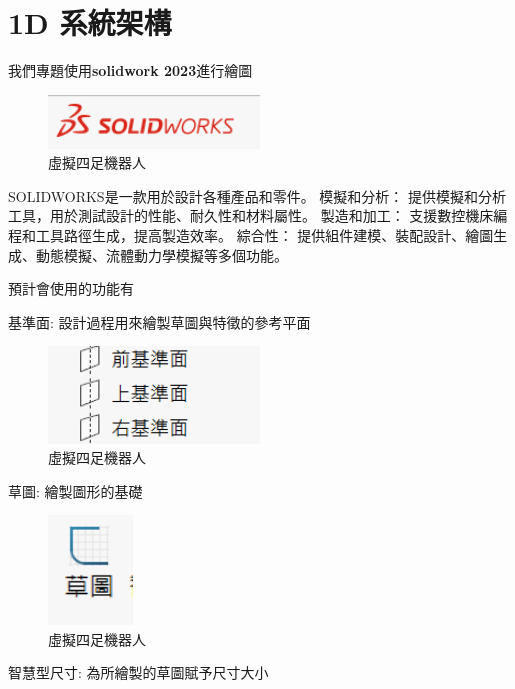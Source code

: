 
\section{1D 系統架構}
我們專題使用\textbf{solidwork 2023}進行繪圖

\begin{figure}[h!]
    \centering
    \includegraphics[width=0.5\textwidth]{./../images/6-1-1.png}
    \caption{\Large 虛擬四足機器人}
\end{figure}

\noindent SOLIDWORKS是一款用於設計各種產品和零件。 模擬和分析： 提供模擬和分析工具，用於測試設計的性能、耐久性和材料屬性。 製造和加工： 支援數控機床編程和工具路徑生成，提高製造效率。 綜合性： 提供組件建模、裝配設計、繪圖生成、動態模擬、流體動力學模擬等多個功能。

\noindent 預計會使用的功能有

\noindent 基準面: 設計過程用來繪製草圖與特徵的參考平面

\begin{figure}[h!]
    \centering
    \includegraphics[width=0.5\textwidth]{./../images/6-1-2.png}
    \caption{\Large 虛擬四足機器人}
\end{figure}

\noindent 草圖: 繪製圖形的基礎

\begin{figure}[h!]
    \centering
    \includegraphics[width=0.2\textwidth]{./../images/6-1-3.png}
    \caption{\Large 虛擬四足機器人}
\end{figure}

\noindent 智慧型尺寸: 為所繪製的草圖賦予尺寸大小

